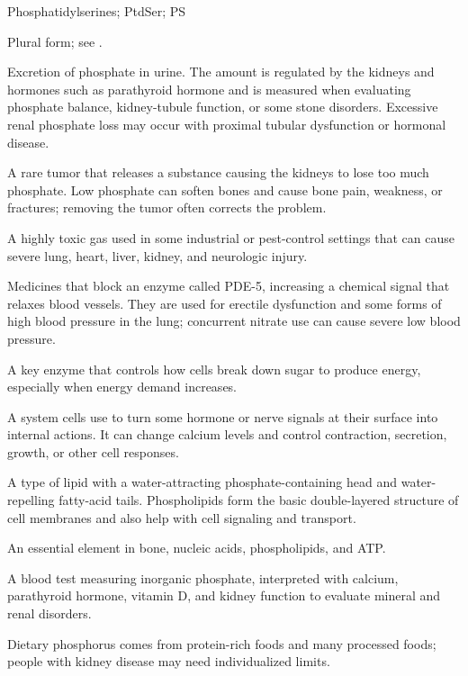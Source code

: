 \synonyms
Phosphatidylserines; PtdSer; PS

 Plural form; see .

 Excretion of phosphate in urine. The amount is regulated by the
kidneys and hormones such as parathyroid hormone and is measured when evaluating phosphate
balance, kidney-tubule function, or some stone disorders. Excessive renal phosphate loss
may occur with proximal tubular dysfunction or hormonal disease.

 A rare tumor that releases a substance causing the kidneys to lose too much phosphate. Low phosphate can soften bones and cause bone pain, weakness, or fractures; removing the tumor often corrects the problem.

 A highly toxic gas used in some industrial or pest-control settings that can cause severe lung, heart, liver, kidney, and neurologic injury.

 Medicines that block an enzyme called PDE-5, increasing a chemical signal that relaxes blood vessels. They are used for erectile dysfunction and some forms of high blood pressure in the lung; concurrent nitrate use can cause severe low blood pressure.

 A key enzyme that controls how cells break down sugar to produce energy, especially when energy demand increases.

 A system cells use to turn some hormone or nerve signals at their surface into internal actions. It can change calcium levels and control contraction, secretion, growth, or other cell responses.

 A type of lipid with a water-attracting phosphate-containing head and water-repelling fatty-acid tails. Phospholipids form the basic double-layered structure of cell membranes and also help with cell signaling and transport.

 An essential element in bone, nucleic acids, phospholipids, and ATP.

 A blood test measuring inorganic phosphate, interpreted with calcium, parathyroid hormone, vitamin D, and kidney function to evaluate mineral and renal disorders.

 Dietary phosphorus comes from protein-rich foods and many processed foods; people with kidney disease may need individualized limits.

